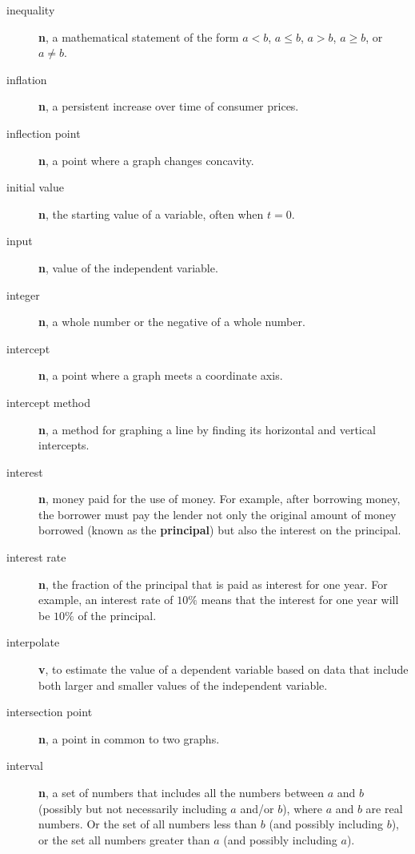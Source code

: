 \documentclass[10pt,]{book}
\newcommand{\terminology}[1]{\textbf{#1}}
\theoremstyle{plain}
\theoremstyle{definition}
\theoremstyle{definition}
\theoremstyle{definition}
\numberwithin{equation}{part}
\newcommand{\lt}{<}
\newcommand{\gt}{>}
\begin{document}
\begin{description}
\item[{inequality}]\hypertarget{li-626}{}\terminology{n}, a mathematical statement of the form \(a\lt b\), \(a\le b\), \(a\gt b\), \(a\ge b\), or \(a\ne b\).%
\item[{inflation}]\hypertarget{li-627}{}\terminology{n}, a persistent increase over time of consumer prices.%
\item[{inflection point}]\hypertarget{li-628}{}\terminology{n}, a point where a graph changes concavity.%
\item[{initial value}]\hypertarget{li-629}{}\terminology{n}, the starting value of a variable, often when \(t = 0\).%
\item[{input}]\hypertarget{li-630}{}\terminology{n}, value of the independent variable.%
\item[{integer}]\hypertarget{li-631}{}\terminology{n}, a whole number or the negative of a whole number.%
\item[{intercept}]\hypertarget{li-632}{}\terminology{n}, a point where a graph meets a coordinate axis.%
\item[{intercept method}]\hypertarget{li-633}{}\terminology{n}, a method for graphing a line by finding its horizontal and vertical intercepts.%
\item[{interest}]\hypertarget{li-634}{}\terminology{n}, money paid for the use of money. For example, after borrowing money, the borrower must pay the lender not only the original amount of money borrowed (known as the \terminology{principal}) but also the interest on the principal.%
\item[{interest rate}]\hypertarget{li-635}{}\terminology{n}, the fraction of the principal that is paid as interest for one year. For example, an interest rate of \(10\%\) means that the interest for one year will be \(10\%\) of the principal.%
\item[{interpolate}]\hypertarget{li-636}{}\terminology{v}, to estimate the value of a dependent variable based on data that include both larger and smaller values of the independent variable.%
\item[{intersection point}]\hypertarget{li-637}{}\terminology{n}, a point in common to two graphs.%
\item[{interval}]\hypertarget{li-638}{}\terminology{n}, a set of numbers that includes all the numbers between \(a\) and \(b\) (possibly but not necessarily including \(a\) and/or \(b\)), where \(a\) and \(b\) are real numbers. Or the set of all numbers less than \(b\) (and possibly including \(b\)), or the set all numbers greater than \(a\) (and possibly including \(a\)).%

\end{description}
\end{document}
